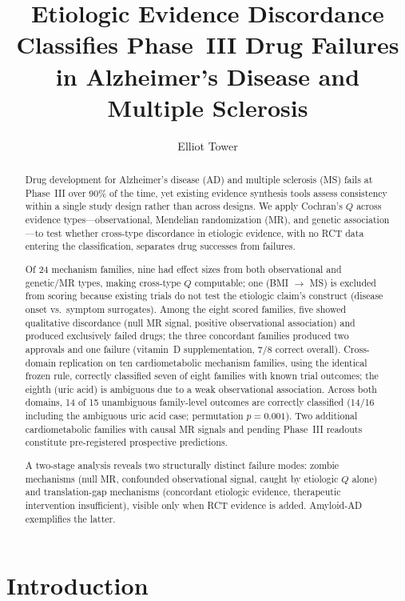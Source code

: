 \documentclass[11pt]{article}
\title{Etiologic Evidence Discordance Classifies Phase~III Drug Failures in Alzheimer's Disease and Multiple Sclerosis}
\author{Elliot Tower}
\affil{Independent researcher \\ \texttt{elliot@elliottower.ai}}
\date{}
\begin{document}
\maketitle

\begin{abstract}
Drug development for Alzheimer's disease (AD) and multiple sclerosis (MS) fails at Phase~III over 90\% of the time, yet existing evidence synthesis tools assess consistency within a single study design rather than across designs. We apply Cochran's $Q$ across evidence types---observational, Mendelian randomization (MR), and genetic association---to test whether cross-type discordance in etiologic evidence, with no RCT data entering the classification, separates drug successes from failures.

Of 24 mechanism families, nine had effect sizes from both observational and genetic/MR types, making cross-type $Q$ computable; one (BMI $\to$ MS) is excluded from scoring because existing trials do not test the etiologic claim's construct (disease onset vs.\ symptom surrogates). Among the eight scored families, five showed qualitative discordance (null MR signal, positive observational association) and produced exclusively failed drugs; the three concordant families produced two approvals and one failure (vitamin~D supplementation, 7/8 correct overall). Cross-domain replication on ten cardiometabolic mechanism families, using the identical frozen rule, correctly classified seven of eight families with known trial outcomes; the eighth (uric acid) is ambiguous due to a weak observational association. Across both domains, 14 of 15 unambiguous family-level outcomes are correctly classified (14/16 including the ambiguous uric acid case; permutation $p = 0.001$). Two additional cardiometabolic families with causal MR signals and pending Phase~III readouts constitute pre-registered prospective predictions.

A two-stage analysis reveals two structurally distinct failure modes: zombie mechanisms (null MR, confounded observational signal, caught by etiologic $Q$ alone) and translation-gap mechanisms (concordant etiologic evidence, therapeutic intervention insufficient), visible only when RCT evidence is added. Amyloid-AD exemplifies the latter.
\end{abstract}

\section{Introduction}
\end{document}
